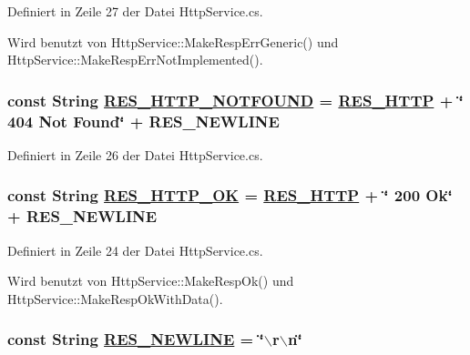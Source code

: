 Definiert in Zeile 27 der Datei Http\-Service.cs.

Wird benutzt von Http\-Service::Make\-Resp\-Err\-Generic() und Http\-Service::Make\-Resp\-Err\-Not\-Implemented().\hypertarget{classQbeSAS_1_1HttpService_QbeSAS_1_1HttpServicer8}{
\subsubsection[RES\_\-HTTP\_\-NOTFOUND]{\setlength{\rightskip}{0pt plus 5cm}const String \hyperlink{classQbeSAS_1_1HttpService_QbeSAS_1_1HttpServicer8}{RES\_\-HTTP\_\-NOTFOUND} = \hyperlink{classQbeSAS_1_1HttpService_QbeSAS_1_1HttpServicer5}{RES\_\-HTTP} + \char`\"{} 404 Not Found\char`\"{} + RES\_\-NEWLINE}}
\label{classQbeSAS_1_1HttpService_QbeSAS_1_1HttpServicer8}




Definiert in Zeile 26 der Datei Http\-Service.cs.\hypertarget{classQbeSAS_1_1HttpService_QbeSAS_1_1HttpServicer6}{
\subsubsection[RES\_\-HTTP\_\-OK]{\setlength{\rightskip}{0pt plus 5cm}const String \hyperlink{classQbeSAS_1_1HttpService_QbeSAS_1_1HttpServicer6}{RES\_\-HTTP\_\-OK} = \hyperlink{classQbeSAS_1_1HttpService_QbeSAS_1_1HttpServicer5}{RES\_\-HTTP} + \char`\"{} 200 Ok\char`\"{} + RES\_\-NEWLINE}}
\label{classQbeSAS_1_1HttpService_QbeSAS_1_1HttpServicer6}




Definiert in Zeile 24 der Datei Http\-Service.cs.

Wird benutzt von Http\-Service::Make\-Resp\-Ok() und Http\-Service::Make\-Resp\-Ok\-With\-Data().\hypertarget{classQbeSAS_1_1HttpService_QbeSAS_1_1HttpServicer0}{
\subsubsection[RES\_\-NEWLINE]{\setlength{\rightskip}{0pt plus 5cm}const String \hyperlink{classQbeSAS_1_1HttpService_QbeSAS_1_1HttpServicer0}{RES\_\-NEWLINE} = \char`\"{}$\backslash$r$\backslash$n\char`\"{}}}
\label{classQbeSAS_1_1HttpService_QbeSAS_1_1HttpServicer0}




